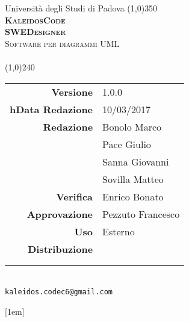 \documentclass[a4paper,12pt]{article}
\author{KaleidosCode}
\date{10/03/2017}	%
\date{\today}
\begin{document}
	\begin{titlepage}
		\centering Università degli Studi di Padova
		\line(1,0){350}\\
		\vspace{0.4cm}
		{\bfseries\scshape\LARGE KaleidosCode\\}
		\vspace{0.4cm}
		{\bfseries\scshape\LARGE SWEDesigner\\}
		{\scshape\Large Software per diagrammi UML\\}
		\vspace{1cm}
		{\scshape\Large \glossarioi\ \\}		%
		\vspace{1.4cm}
		\logo
		\vspace{1.2cm}
		\line(1,0){240}\\
		\begin{tabular}{r|l}
			{\hfill \textbf{Versione}} 			& 1.0.0\\
			{\hfill \textbf{hData Redazione}} 	& 10/03/2017\\	%
			{\hfill \textbf{Redazione}} 		& Bonolo Marco\\ & Pace Giulio\\ & Sanna Giovanni\\ & Sovilla Matteo\\
			{\hfill \textbf{Verifica}} 			& Enrico Bonato\\
			{\hfill \textbf{Approvazione}} 		& Pezzuto Francesco\\
			{\hfill \textbf{Uso}} 				& Esterno\\
			{\hfill \textbf{Distribuzione}} 	& \vardanega \\ & \cardin \\ & \proponente\\
		\end{tabular}\\
		\vspace{2cm}
		\texttt{kaleidos.codec6@gmail.com}
	\end{titlepage}
	
	\pagestyle{myfront}
	\newpage
		
	\newpage
		[1em]{}{\bfseries\fontsize{0.8em}{0.8em}}{}{\contentspage}
		\tableofcontents
	\newpage
	\pagestyle{mymain}
		\titleformat{\section}[block]{\bfseries\fontsize{20pt}{20pt}\selectfont}{}{-0.8em}{}
		\printglossary[style=myaltlistgroup, title=, toctitle=Glossario dei termini]
		\glsaddall

	\label{LastPage}
\end{document}
